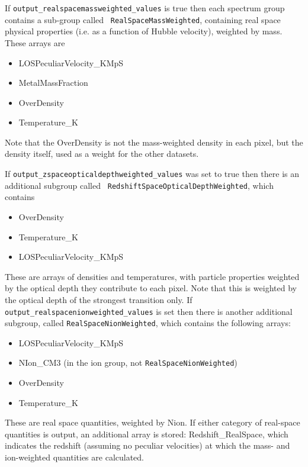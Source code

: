 \documentclass{report}
\begin{document}
If {\tt output\_realspacemassweighted\_values} is true then each
spectrum group contains a sub-group called {\tt
  RealSpaceMassWeighted}, containing real space physical properties
(i.e. as a function of Hubble velocity), weighted by mass.  These
arrays are

\begin{itemize}
\item LOSPeculiarVelocity\_KMpS
\item MetalMassFraction
\item OverDensity
\item Temperature\_K
\end{itemize}
Note that the OverDensity is not the mass-weighted density in each pixel, but the density itself, used as a weight for the other datasets. 

If {\tt output\_zspaceopticaldepthweighted\_values} was set to true
then there is an additional subgroup called {\tt
  RedshiftSpaceOpticalDepthWeighted}, which contains

\begin{itemize}
\item OverDensity
\item Temperature\_K
\item LOSPeculiarVelocity\_KMpS
\end{itemize}

These are arrays of densities and temperatures, with particle properties weighted by the optical depth they contribute to each pixel. Note that this is weighted by the optical depth of the strongest transition only. If {\tt output\_realspacenionweighted\_values} is set then there is another additional subgroup, called {\tt RealSpaceNionWeighted}, which contains the following arrays:

\begin{itemize}
\item LOSPeculiarVelocity\_KMpS
\item NIon\_CM3 (in the ion group, not {\tt RealSpaceNionWeighted})
\item OverDensity
\item Temperature\_K
\end{itemize}

These are real space quantities, weighted by Nion.  If either category of real-space quantities is output, an additional array is stored: Redshift\_RealSpace, which indicates the redshift (assuming no peculiar velocities) at which the mass- and ion-weighted quantities are calculated.
\end{document}
